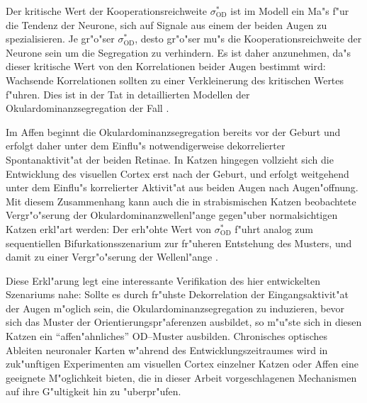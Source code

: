 Der kritische Wert der Kooperationsreichweite $\sigma^\ast_{\text{OD}}$ ist
im Modell ein Ma"s f"ur die Tendenz der Neurone, sich auf Signale aus einem
der beiden Augen zu spezialisieren. Je gr"o"ser $\sigma^\ast_{\text{OD}}$,
desto gr"o"ser mu"s die Kooperationsreichweite der Neurone sein um die
Segregation zu verhindern. Es ist daher anzunehmen, da"s dieser kritische
Wert von den Korrelationen beider Augen bestimmt wird: Wachsende
Korrelationen sollten zu einer Verkleinerung des kritischen Wertes f"uhren.
Dies ist in der Tat in detaillierten Modellen der Okulardominanzsegregation
der Fall \cite{scherf:1994}. 

Im Affen beginnt die Okulardominanzsegregation bereits vor der Geburt
\cite{rakic:1981} und erfolgt daher unter dem Einflu"s
notwendigerweise dekorrelierter Spontanaktivit"at der beiden Retinae.  In
Katzen hingegen vollzieht sich die Entwicklung des visuellen Cortex erst
nach der Geburt, und erfolgt weitgehend unter dem Einflu"s korrelierter
Aktivit"at aus beiden Augen nach Augen"offnung.  Mit diesem Zusammenhang
kann auch die in strabismischen Katzen beobachtete Vergr"o"serung der
Okulardominanzwellenl"ange gegen"uber normalsichtigen Katzen erkl"art
werden: Der erh"ohte Wert von $\sigma^\ast_{\text{OD}}$ f"uhrt analog zum
sequentiellen Bifurkationsszenarium zur fr"uheren Entstehung des Musters,
und damit zu einer Vergr"o"serung der Wellenl"ange
.

Diese Erkl"arung legt eine interessante Verifikation des hier entwickelten
Szenariums nahe: Sollte es durch fr"uhste Dekorrelation der Eingangsaktivit"at
der Augen m"oglich sein, die Okulardominanzsegregation zu induzieren, bevor
sich das Muster der Orientierungspr"aferenzen ausbildet, so m"u"ste sich in
diesen Katzen ein ``affen"ahnliches'' OD--Muster ausbilden.  Chronisches
optisches Ableiten neuronaler Karten w"ahrend des Entwicklungszeitraumes
wird in zuk"unftigen Experimenten am visuellen Cortex einzelner Katzen oder
Affen eine geeignete M"oglichkeit bieten, die in dieser Arbeit
vorgeschlagenen Mechanismen auf ihre G"ultigkeit hin zu "uberpr"ufen.

\nocite{hoffsuemmer95a,hoffsuemmer96}

